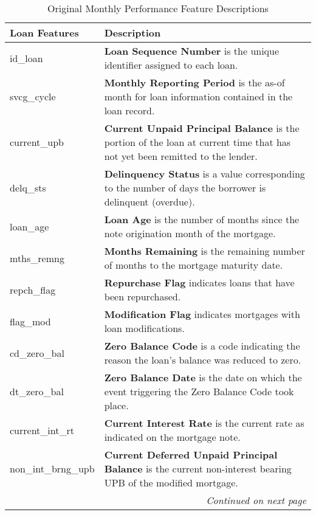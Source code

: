 \begin{appendices}
    
    \begin{table}[h]
    \centering
    \caption{Original Monthly Performance Feature Descriptions} \vspace{0.5cm}
    \label{appendix: table_american_loan_features_monthly}
        \begin{tabular}{|p{4cm}|p{10cm}|}
            \hline \textbf{Loan Features} & \textbf{Description} \\ \hline \hline
            id\_loan & \textbf{Loan Sequence Number} is the unique identifier assigned to each loan. \\ \hline
            svcg\_cycle & \textbf{Monthly Reporting Period} is the as-of month for loan information contained in the loan record. \\ \hline  
            current\_upb & \textbf{Current Unpaid Principal Balance} is the portion of the loan at current time that has not yet been remitted to the lender. \\ \hline
            delq\_sts & \textbf{Delinquency Status} is a value corresponding to the number of days the borrower is delinquent (overdue). \\ \hline  
            loan\_age & \textbf{Loan Age} is the number of months since the note origination month of the mortgage. \\ \hline  
            mths\_remng & \textbf{Months Remaining} is the remaining number of months to the mortgage maturity date. \\ \hline  
            repch\_flag & \textbf{Repurchase Flag} indicates loans that have been repurchased. \\ \hline  
            flag\_mod & \textbf{Modification Flag} indicates mortgages with loan modifications. \\ \hline  
            cd\_zero\_bal & \textbf{Zero Balance Code} is a code indicating the reason the loan's balance was reduced to zero. \\ \hline  
            dt\_zero\_bal & \textbf{Zero Balance Date} is the date on which the event triggering the Zero Balance Code took place. \\ \hline  
            current\_int\_rt & \textbf{Current Interest Rate} is the current rate as indicated on the mortgage note. \\ \hline
            non\_int\_brng\_upb & \textbf{Current Deferred Unpaid Principal Balance} is the current non-interest bearing UPB of the modified mortgage. \\ \hline 
            \multicolumn{2}{r}{\textit{Continued on next page}} \\
            \end{tabular}
    \end{table}
    

\end{appendices}
